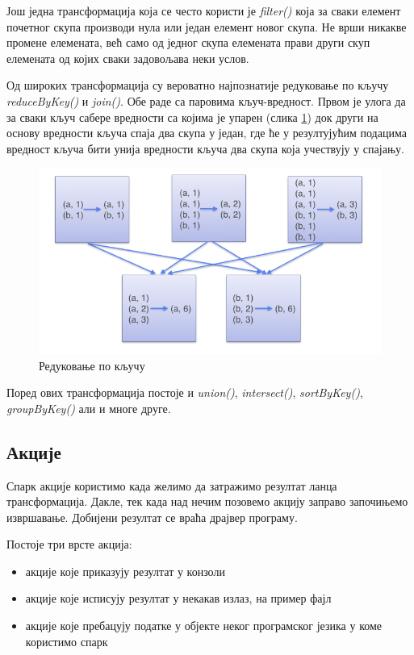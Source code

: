 \documentclass[12pt,oneside]{memoir}
\begin{document}
Још једна трансформација која се често користи је \textit{filter()} која за сваки елемент почетног скупа производи нула или један елемент новог скупа. Не врши никакве промене елемената, већ само од једног скупа елемената прави други скуп елемената од којих сваки задовољава неки услов.

Од широких трансформација су вероватно најпознатије редуковање по кључу \textit{reduceByKey()} и \textit{join()}. Обе раде са паровима кључ-вредност. Првом је улога да за сваки кључ сабере вредности са којима је упарен (слика \ref{fig:sprk_red_by_key}) док други на основу вредности кључа спаја два скупа у један, где ће у резултујућим подацима вредност кључа бити унија вредности кључа два скупа која учествују у спајању.

\begin{figure}[!ht]
  \centering
  \includegraphics[width=1\textwidth]{pictures/spark_reduce_by_key.png}
  \caption{Редуковање по кључу}
  \label{fig:sprk_red_by_key}
\end{figure}

Поред ових трансформација постоје и \textit{union()}, \textit{intersect()}, \textit{sortByKey()}, \textit{groupByKey()} али и многе друге. \cite{spark_rdd}

\subsection{Акције}
\label{subsec:spark_akc}

Спарк акције користимо када желимо да затражимо резултат ланца трансформација. Дакле, тек када над нечим позовемо акцију заправо започињемо извршавање. Добијени резултат се враћа драјвер програму. \cite{spark_guide}

Постоје три врсте акција:
\begin{itemize}
\item акције које приказују резултат у конзоли
\item акције које исписују резултат у некакав излаз, на пример фајл
\item акције које пребацују податке у објекте неког програмског језика у коме користимо спарк
\end{itemize}
\end{document}
